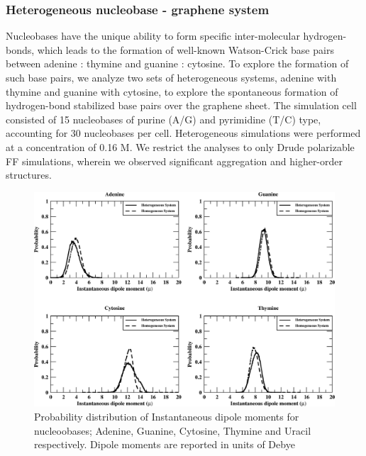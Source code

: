     \subsubsection{Heterogeneous nucleobase - graphene system}
    Nucleobases have the unique ability to form specific inter-molecular hydrogen-bonds, which leads to the formation of well-known Watson-Crick base pairs between adenine : thymine and guanine : cytosine. To explore the formation of such base pairs, we analyze two sets of heterogeneous systems, adenine with thymine and guanine with cytosine, to explore the spontaneous formation of hydrogen-bond stabilized base pairs over the graphene sheet. The simulation cell consisted of 15 nucleobases of purine (A/G) and pyrimidine (T/C) type, accounting for 30 nucleobases per cell. Heterogeneous simulations were performed at a concentration of 0.16 M. We restrict the analyses to only Drude polarizable FF simulations, wherein we observed significant aggregation and higher-order structures.
    \begin{figure}
        \centering
        \includegraphics[width=\textwidth]{Chapter1/Figures/hetdipole.png}
        \caption[Probability distribution of Instantaneous dipole moments for nucleoobases; Adenine, Guanine, Cytosine, Thymine and Uracil respectively]{Probability distribution of Instantaneous dipole moments for nucleoobases; Adenine, Guanine, Cytosine, Thymine and Uracil respectively. Dipole moments are reported in units of Debye}
    \end{figure}
